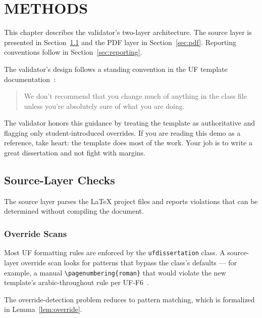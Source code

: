 
\chapter{METHODS}\label{ch:methods}

This chapter describes the validator's two-layer architecture. The
source layer is presented in Section~\ref{sec:source} and the PDF
layer in Section~\ref{sec:pdf}. Reporting conventions follow in
Section~\ref{sec:reporting}.

The validator's design follows a standing convention in the UF
template documentation~\citep{ufitTemplates2026}:
\begin{quote}
We don't recommend that you change much of anything in the class file
unless you're absolutely sure of what you are doing.
\end{quote}
The validator honors this guidance by treating the template as
authoritative and flagging only student-introduced overrides. If you
are reading this demo as a reference, take heart: the template does
most of the work. Your job is to write a great dissertation and not
fight with margins.

\section{Source-Layer Checks}\label{sec:source}

The source layer parses the LaTeX project files and reports violations
that can be determined without compiling the document.

\subsection{Override Scans}

Most UF formatting rules are enforced by the \texttt{ufdissertation}
class. A source-layer override scan looks for patterns that bypass the
class's defaults --- for example, a manual
\texttt{\textbackslash pagenumbering\{roman\}} that would violate the
new template's arabic-throughout rule per
UF-F6~\citep{ufFormatting2026}.

The override-detection problem reduces to pattern matching, which is
formalized in Lemma~\ref{lem:override}.


